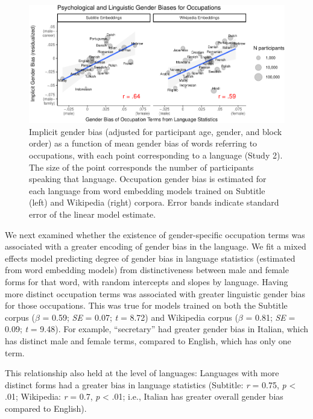 \documentclass[9pt,twocolumn,twoside]{pnas-new}
\begin{document}
\begin{figure}[t!]
\centering
\includegraphics{pnas_rmd/iat_lang_pnas_files/figure-latex/unnamed-chunk-15-1.pdf}
\caption{\label{fig:unnamed-chunk-15}Implicit gender bias (adjusted for participant age,
gender, and block order) as a function of mean gender bias of words
referring to occupations, with each point corresponding to a language
(Study 2). The size of the point corresponds the number of participants
speaking that language. Occupation gender bias is estimated for each
language from word embedding models trained on Subtitle (left) and
Wikipedia (right) corpora. Error bands indicate standard error of the
linear model estimate.}
\end{figure}

We next examined whether the existence of gender-specific occupation terms was associated with a greater encoding of gender bias in the language. We fit a mixed effects model predicting degree of gender bias in language statistics (estimated from word embedding models) from distinctiveness between male and female forms for that word, with random intercepts and slopes by language. Having more distinct occupation terms was associated with greater linguistic gender bias for those occupations. This was true for models trained on both the Subtitle corpus (\(\beta\) = 0.59; \emph{SE} = 0.07; \emph{t} = 8.72) and Wikipedia
corpus (\(\beta\) = 0.81; \emph{SE} = 0.09; \emph{t} = 9.48). For example, \enquote{secretary} had greater gender bias in Italian, which has distinct male and female terms, compared to English, which has only one term. 

This relationship also held at the level of languages: Languages with more
distinct forms had a greater bias in language statistics
(Subtitle: \emph{r} = 0.75, \emph{p} \textless{} .01; Wikipedia:
\emph{r} = 0.7, \emph{p} \textless{} .01; i.e., Italian has greater overall gender bias compared to English).
\end{document}
